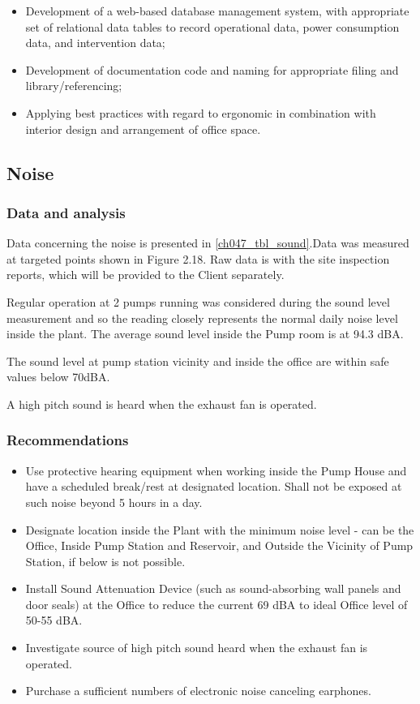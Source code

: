 \begin{itemize}
\item Development of a web-based database management system, with appropriate set of relational data tables to record operational data, power consumption data, and intervention data;

\item Development of documentation code and naming for appropriate filing and library/referencing;

\item Applying best practices with regard to ergonomic in combination with interior design and arrangement of office space.

\end{itemize}

\subsection{Noise}\label{aq06}
\subsubsection{Data and analysis}
Data concerning the noise is presented in \ref{ch047_tbl_sound}.Data was measured at targeted points shown in Figure 2.18. Raw data is with the site inspection reports, which will be provided to the Client separately. 



Regular operation at 2 pumps running was considered during the sound level measurement and so the reading closely represents the normal daily noise level inside the plant. The average sound level inside the Pump room is at 94.3 dBA.

The sound level at pump station vicinity and inside the office are within safe values below 70dBA.

A high pitch sound is heard when the exhaust fan is operated.

\subsubsection{Recommendations}

\begin{itemize}
	\item	Use protective hearing equipment when working inside the Pump House and have a scheduled break/rest at designated location. Shall not be exposed at such noise beyond 5 hours in a day.
	\item	Designate location inside the Plant with the minimum noise level - can be the Office, Inside Pump Station and Reservoir, and Outside the Vicinity of Pump Station, if below is not possible.
	\item	 Install Sound Attenuation Device (such as sound-absorbing wall panels and door seals) at the Office to reduce the current 69 dBA to ideal Office level of 50-55 dBA.
	\item	Investigate source of high pitch sound heard when the exhaust fan is operated.
		\item Purchase a sufficient numbers of electronic noise canceling earphones.
\end{itemize}


